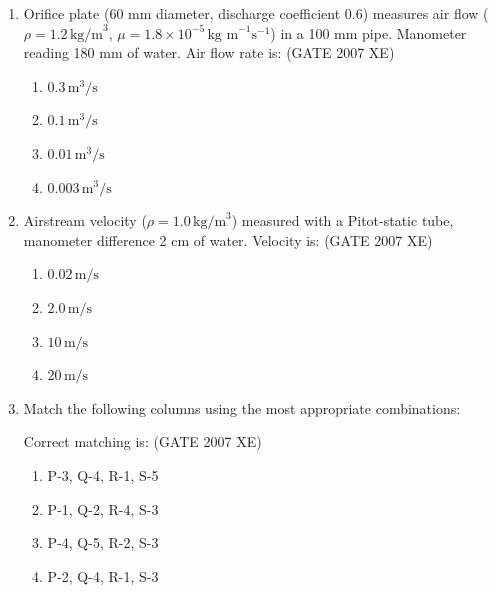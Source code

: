 \documentclass[journal,cmex10]{IEEEtran}
\theoremstyle{remark}
\numberwithin{equation}{enumi}
\numberwithin{figure}{enumi}
\begin{document}
\begin{enumerate}
\begin{multicols}{4}
\begin{enumerate}
    \item P, Q, R
    \item P, R, S
    \item P, S
    \item Q, R
\end{enumerate}
\end{multicols}


\item Orifice plate (60 mm diameter, discharge coefficient 0.6) measures air flow ($\rho = 1.2\,\text{kg/m}^3$, $\mu=1.8 \times 10^{-5}\,\text{kg m}^{-1}\text{s}^{-1}$) in a 100 mm pipe. Manometer reading 180 mm of water. Air flow rate is:  
\hfill{(GATE 2007 XE)}
\begin{multicols}{4}
\begin{enumerate}
    \item $0.3\,\text{m}^3/\text{s}$
    \item $0.1\,\text{m}^3/\text{s}$
    \item $0.01\,\text{m}^3/\text{s}$
    \item $0.003\,\text{m}^3/\text{s}$
\end{enumerate}
\end{multicols}

\newpage
\item Airstream velocity ($\rho=1.0\,\text{kg/m}^3$) measured with a Pitot-static tube, manometer difference 2 cm of water. Velocity is:  
\hfill{(GATE 2007 XE)}

\begin{multicols}{4}
\begin{enumerate}
    \item $0.02\,\text{m/s}$
    \item $2.0\,\text{m/s}$
    \item $10\,\text{m/s}$
    \item $20\,\text{m/s}$
\end{enumerate}
\end{multicols}

\item Match the following columns using the most appropriate combinations:  



Correct matching is:  
\hfill{(GATE 2007 XE)}
\begin{multicols}{2}
\begin{enumerate}
    \item P-3, Q-4, R-1, S-5
    \item P-1, Q-2, R-4, S-3
    \item P-4, Q-5, R-2, S-3
    \item P-2, Q-4, R-1, S-3
\end{enumerate}
\end{multicols}


\end{enumerate}
\end{document}
